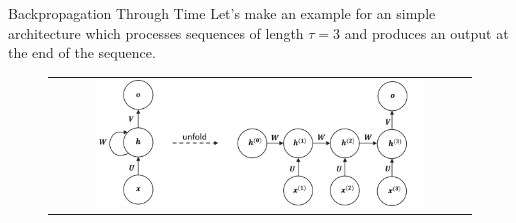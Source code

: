 \documentclass[aspectratio=169]{beamer}
\begin{document}
\begin{frame}{Backpropagation Through Time}
Let's make an example for an simple architecture which processes sequences of length $\tau=3$ and produces an output at the end of the sequence.
\begin{figure}
\begin{tabular}{c}
\includegraphics[width=0.8\textwidth]{img/rnn/bptt.png}
\end{tabular}
\end{figure}
\end{frame}

\end{document}
